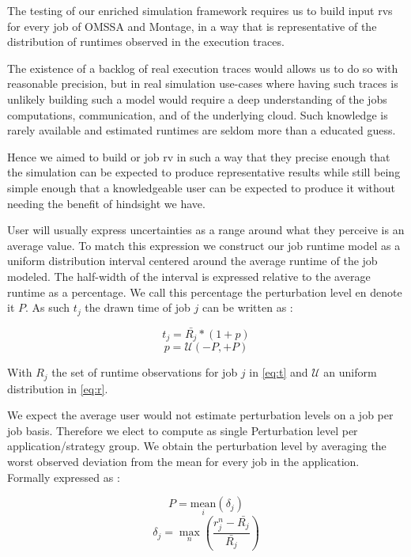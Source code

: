 \documentclass[10pt,conference,compsocconf]{IEEEtran}
\begin{document}
The testing of our enriched simulation framework requires us to build input
\acp{rv} for every job of OMSSA and Montage, in a way that is representative of
the distribution of runtimes observed in the execution traces.

The existence of a backlog of real execution traces would allows us to do so with
reasonable precision, but in real simulation use-cases where having such traces
is unlikely building such a model would require a deep understanding of the jobs
computations, communication, and of the underlying cloud. Such knowledge is
rarely available and estimated runtimes are seldom more than a educated guess.

Hence we aimed to build or job \ac{rv} in such a way that they precise enough
that the simulation can be expected to produce representative results while
still being simple enough that a knowledgeable user can be expected to produce
it without needing the benefit of hindsight we have.

User will usually express uncertainties as a range around what they perceive is
an average value. To match this expression we construct our job runtime model as
a uniform distribution interval centered around the average runtime of the job
modeled. The half-width of the interval is expressed relative to the average
runtime as a percentage. We call this percentage the perturbation level en
denote it $P$. As such $t_j$ the drawn time of job $j$ can be written as : 

\begin{equation}
	t_j = \bar{R_j} * (1 + p)
	\label{eq:t}
\end{equation}
\begin{equation}
	p = \mathcal{U}(-P,+P)
	\label{eq:r}
\end{equation}

With $R_j$ the set of runtime observations for job $j$ in \eqref{eq:t} and
$\mathcal{U}$ an uniform distribution in \eqref{eq:r}.  

We expect the average user would not estimate perturbation levels on a job per
job basis. Therefore we elect to compute as single Perturbation level per
application/strategy group. We obtain the perturbation level by averaging the
worst observed deviation from the mean for every job in the application.
Formally expressed as :

\begin{equation}
P = \underset{i}{\textrm{mean}}(\delta{}_j)
\label{eq:P}
\end{equation}
\begin{equation}
\delta{}_j =
\max_n\left(\frac{r_j^n-\bar{R_j}}{\bar{R_j}}\right)
\label{eq:d}
\end{equation}
\end{document}
